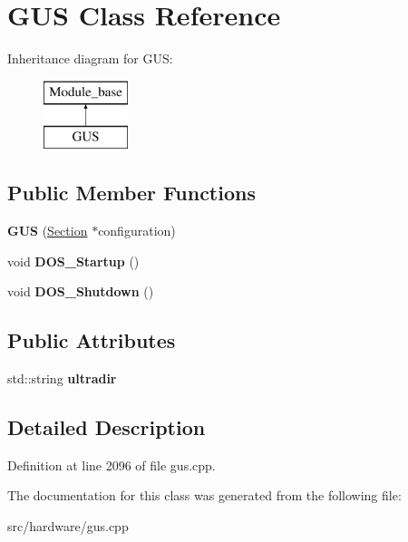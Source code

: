 \hypertarget{classGUS}{\section{G\-U\-S Class Reference}
\label{classGUS}
}
Inheritance diagram for G\-U\-S\-:\begin{figure}[H]
\begin{center}
\leavevmode
\includegraphics[height=2.000000cm]{classGUS}
\end{center}
\end{figure}
\subsection*{Public Member Functions}
\begin{DoxyCompactItemize}
\item 
\hypertarget{classGUS_a4ee14e2fc1aae1aef9cc6306d227dbf2}{{\bfseries G\-U\-S} (\hyperlink{classSection}{Section} $\ast$configuration)}\label{classGUS_a4ee14e2fc1aae1aef9cc6306d227dbf2}

\item 
\hypertarget{classGUS_aeb099ead25e3d56aeb70ecf72a85f14f}{void {\bfseries D\-O\-S\-\_\-\-Startup} ()}\label{classGUS_aeb099ead25e3d56aeb70ecf72a85f14f}

\item 
\hypertarget{classGUS_a36434682ec12dc37bd71575231bf287d}{void {\bfseries D\-O\-S\-\_\-\-Shutdown} ()}\label{classGUS_a36434682ec12dc37bd71575231bf287d}

\end{DoxyCompactItemize}
\subsection*{Public Attributes}
\begin{DoxyCompactItemize}
\item 
\hypertarget{classGUS_a3f1bfc9fabf97294cd24f1631368729a}{std\-::string {\bfseries ultradir}}\label{classGUS_a3f1bfc9fabf97294cd24f1631368729a}

\end{DoxyCompactItemize}


\subsection{Detailed Description}


Definition at line 2096 of file gus.\-cpp.



The documentation for this class was generated from the following file\-:\begin{DoxyCompactItemize}
\item 
src/hardware/gus.\-cpp\end{DoxyCompactItemize}
